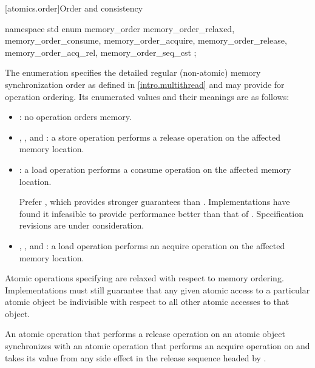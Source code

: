 [atomics.order]{Order and consistency}

\begin{codeblock}
namespace std {
  enum memory_order {
    memory_order_relaxed, memory_order_consume, memory_order_acquire, 
    memory_order_release, memory_order_acq_rel, memory_order_seq_cst
  };
}
\end{codeblock}

\pnum
The enumeration  specifies the detailed regular
(non-atomic) memory synchronization order as defined in
\ref{intro.multithread} and may provide for operation ordering. Its
enumerated values and their meanings are as follows:

\begin{itemize}
\item {}: no operation orders memory.

\item {}, , and
: a store operation performs a release operation on the
affected memory location.

\item {}: a load operation performs a consume operation on the
affected memory location.
\begin{note} Prefer , which provides stronger guarantees
than . Implementations have found it infeasible
to provide performance better than that of .
Specification revisions are under consideration. \end{note}

\item {}, , and
: a load operation performs an acquire operation on the
affected memory location.
\end{itemize}

\begin{note} Atomic operations specifying  are relaxed
with respect to memory ordering. Implementations must still guarantee that any
given atomic access to a particular atomic object be indivisible with respect
to all other atomic accesses to that object. \end{note}

\pnum
An atomic operation  that performs a release operation on an atomic
object  synchronizes with an atomic operation  that performs
an acquire operation on  and takes its value from any side effect in the
release sequence headed by .

